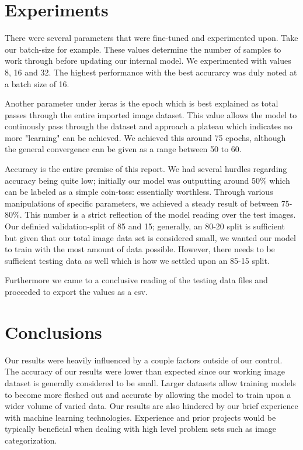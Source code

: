 \documentclass[conference]{IEEEtran}
\begin{document}
\section{Experiments}
There were several parameters that were fine-tuned and experimented upon. Take our batch-size for example. These values determine the number of samples to work through before updating our internal model. We experimented with values 8, 16 and 32. The highest performance with the best accurarcy was duly noted at a batch size of 16. 

Another parameter under keras is the epoch which is best explained as total passes through the entire imported image dataset. This value allows the model to continously pass through the dataset and approach a plateau which indicates no more "learning" can be achieved. We achieved this around 75 epochs, although the general convergence can be given as a range between 50 to 60.

Accuracy is the entire premise of this report. We had several hurdles regarding accuracy being quite low; initially our model was outputting around 50\% which can be labeled as a simple coin-toss: essentially worthless. Through various manipulations of specific parameters, we achieved a steady result of between 75-80\%. This number is a strict reflection of the model reading over the test images. Our definied validation-split of 85 and 15; generally, an 80-20 split is sufficient but given that our total image data set is considered small, we wanted our model to train with the most amount of data possible. However, there needs to be sufficient testing data as well which is how we settled upon an 85-15 split.

Furthermore we came to a conclusive reading of the testing data files and proceeded to export the values as a csv. 


\section{Conclusions}
Our results were heavily influenced by a couple factors outside of our control. The accuracy of our results were lower than expected since our working image dataset is generally considered to be small. Larger datasets allow training models to become more fleshed out and accurate by allowing the model to train upon a wider volume of varied data. Our results are also hindered by our brief experience with machine learning technologies. Experience and prior projects would be typically beneficial when dealing with high level problem sets such as image categorization. 
\end{document}
